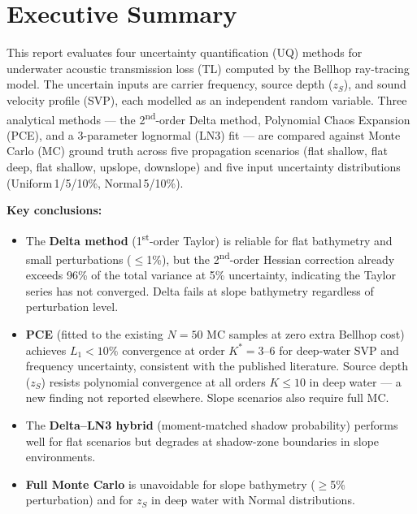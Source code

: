 \documentclass[11pt,a4paper]{article}
\begin{document}

\section*{Executive Summary}

This report evaluates four uncertainty quantification (UQ) methods for
underwater acoustic transmission loss (TL) computed by the Bellhop ray-tracing
model.
The uncertain inputs are carrier frequency, source depth ($z_S$), and sound
velocity profile (SVP), each modelled as an independent random variable.
Three analytical methods --- the 2\textsuperscript{nd}-order Delta method,
Polynomial Chaos Expansion (PCE), and a 3-parameter lognormal (LN3) fit --- are
compared against Monte Carlo (MC) ground truth across five propagation scenarios
(flat shallow, flat deep, flat shallow, upslope, downslope) and five input
uncertainty distributions (Uniform\,1/5/10\%, Normal\,5/10\%).

\textbf{Key conclusions:}
\begin{itemize}
  \item The \textbf{Delta method} (1\textsuperscript{st}-order Taylor) is
        reliable for flat bathymetry and small perturbations ($\leq$1\%), but the
        2\textsuperscript{nd}-order Hessian correction already exceeds 96\% of the
        total variance at 5\% uncertainty, indicating the Taylor series has not
        converged.  Delta fails at slope bathymetry regardless of perturbation
        level.
  \item \textbf{PCE} (fitted to the existing $N=50$ MC samples at zero extra
        Bellhop cost) achieves $L_1 < 10\%$ convergence at order $K^* = 3$--$6$
        for deep-water SVP and frequency uncertainty, consistent with the
        published literature.  Source depth ($z_S$) resists polynomial convergence
        at all orders $K \leq 10$ in deep water --- a new finding not reported
        elsewhere.  Slope scenarios also require full MC.
  \item The \textbf{Delta--LN3 hybrid} (moment-matched shadow probability)
        performs well for flat scenarios but degrades at shadow-zone boundaries in
        slope environments.
  \item \textbf{Full Monte Carlo} is unavoidable for slope bathymetry ($\geq$5\%
        perturbation) and for $z_S$ in deep water with Normal distributions.
\end{itemize}
\end{document}
